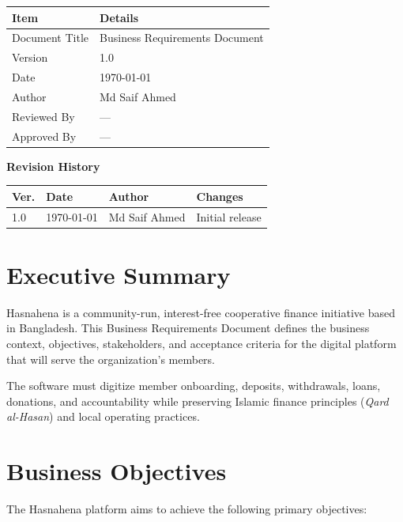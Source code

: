 \documentclass[11pt,a4paper]{article}
\newcommand{\DocumentTitle}{Business Requirements Document}
\newcommand{\DocumentVersion}{1.0}
\newcommand{\DocumentDate}{\today}
\begin{document}
\begin{tabular}{@{}p{3cm}p{10cm}@{}}
\toprule
\textbf{Item} & \textbf{Details} \\
\midrule
Document Title & \DocumentTitle \\
Version & \DocumentVersion \\
Date & \DocumentDate \\
Author & Md Saif Ahmed \\
Reviewed By & --- \\
Approved By & --- \\
\bottomrule
\end{tabular}

\vspace{1em}

\textbf{Revision History}

\begin{tabular}{@{}p{1.5cm}p{2.5cm}p{3cm}p{6cm}@{}}
\toprule
\textbf{Ver.} & \textbf{Date} & \textbf{Author} & \textbf{Changes} \\
\midrule
1.0 & \DocumentDate & Md Saif Ahmed & Initial release \\
\bottomrule
\end{tabular}

\newpage


\section{Executive Summary}

Hasnahena is a community-run, interest-free cooperative finance initiative based in Bangladesh. This Business Requirements Document defines the business context, objectives, stakeholders, and acceptance criteria for the digital platform that will serve the organization's members.

The software must digitize member onboarding, deposits, withdrawals, loans, donations, and accountability while preserving Islamic finance principles (\textit{Qard al-Hasan}) and local operating practices.

\section{Business Objectives}

The Hasnahena platform aims to achieve the following primary objectives:
\end{document}
